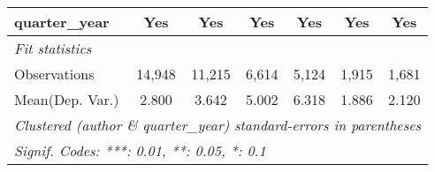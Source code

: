 \begin{tabular}{lcccccc}
   quarter\_year                         & Yes           & Yes           & Yes           & Yes           & Yes          & Yes\\  
   \midrule
   \emph{Fit statistics}\\
   Observations                          & 14,948        & 11,215        & 6,614         & 5,124         & 1,915        & 1,681\\  
Mean(Dep. Var.) & 2.800 & 3.642 & 5.002 & 6.318 & 1.886 & 2.120 \\
   \midrule \midrule
   \multicolumn{7}{l}{\emph{Clustered (author \& quarter\_year) standard-errors in parentheses}}\\
   \multicolumn{7}{l}{\emph{Signif. Codes: ***: 0.01, **: 0.05, *: 0.1}}\\
\end{tabular}
\par\endgroup
